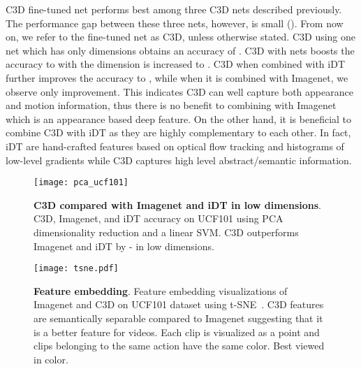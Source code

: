 \documentclass[10pt,twocolumn,letterpaper]{article}
\begin{document}
C3D fine-tuned net performs best among three C3D nets described previously. The performance gap between these three nets, however, is small (). From now on, we refer to the fine-tuned net as C3D, unless otherwise stated. C3D using one net which has only  dimensions obtains an accuracy of . C3D with  nets boosts the accuracy to  with the dimension is increased to . C3D when combined with iDT further improves the accuracy to , while when it is combined with Imagenet, we observe only  improvement. This indicates C3D can well capture both appearance and motion information, thus there is no benefit to combining with Imagenet which is an appearance based deep feature. On the other hand, it is beneficial to combine C3D with iDT as they are highly complementary to each other. In fact, iDT are hand-crafted features based on optical flow tracking and histograms of low-level gradients while C3D captures high level abstract/semantic information. 

\begin{figure}
\begin{center}
   \texttt{[image: pca\_ucf101]}
\end{center}
\vspace{-12pt}
   \caption{{\bf C3D compared with Imagenet and iDT in low dimensions}. C3D, Imagenet, and iDT accuracy on UCF101 using PCA dimensionality reduction and a linear SVM. C3D outperforms Imagenet and iDT by - in low dimensions.}
\label{fig:pca_ucf101}
\end{figure}


\begin{figure}[t]
\begin{center}
   \texttt{[image: tsne.pdf]}
\end{center}
\vspace{-12pt}
   \caption{{\bf Feature embedding}. Feature embedding visualizations of Imagenet and C3D on UCF101 dataset using t-SNE~\cite{van2008visualizing}. C3D features are semantically separable compared to Imagenet suggesting that it is a better feature for videos. Each clip is visualized as a point and clips belonging to the same action have the same color. Best viewed in color.}
\vspace{-16pt}
\label{fig:feature_embbeding}
\end{figure}
\end{document}
